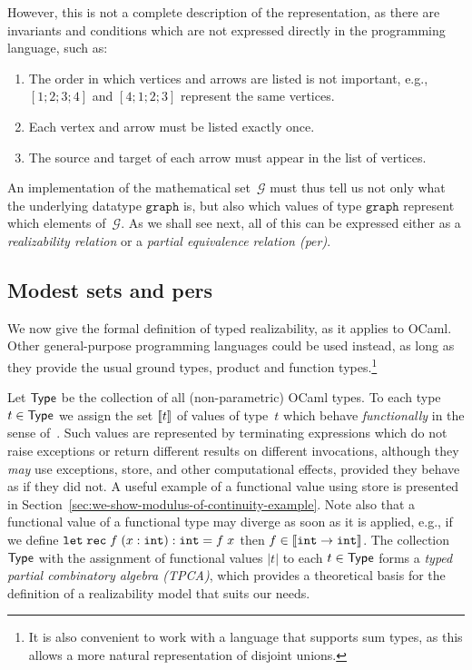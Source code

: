 %
However, this is not a complete description of the representation, as
there are invariants and conditions which are not expressed directly
in the programming language, such as:
%
\begin{enumerate}
\item The order in which vertices and arrows are listed is not
  important, e.g., $[1;2;3;4]$ and $[4;1;2;3]$ represent the same vertices.
\item Each vertex and arrow must be listed exactly once.
\item The source and target of each arrow must appear in the list of vertices.
\end{enumerate}
%
An implementation of the mathematical set~$\mathcal{G}$ must thus tell
us not only what the underlying datatype $\mathtt{graph}$ is, but also
which values of type $\mathtt{graph}$ represent which elements
of~$\mathcal{G}$. As we shall see next, all of this can be expressed
either as a \emph{realizability relation} or a \emph{partial
  equivalence relation (per)}.


\subsection{Modest sets and pers}
\label{sec:modest-sets-pers}

We now give the formal definition of typed realizability, as it
applies to OCaml. Other general-purpose programming languages could be
used instead, as long as they provide the usual ground types, product
and function types.\footnote{ It is also convenient to work with a
language that supports sum types, as this allows a more natural
representation of disjoint unions.}

Let $\mathsf{Type}$ be the collection of all (non-parametric) OCaml types. To
each type $t \in \mathsf{Type}$ we assign the set $[\![t]\!]$ of values of
type~$t$ which behave \emph{functionally} in the sense
of~\cite{longley99when}. Such values are represented by terminating
expressions which do not raise exceptions or return different results
on different invocations, although they \emph{may} use exceptions,
store, and other computational effects, provided they behave as if
they did not. A useful example of a functional value using store is
presented in Section~\ref{sec:we-show-modulus-of-continuity-example}.
Note also that a functional value of a functional type may diverge as
soon as it is applied, e.g., if we define
$\mathtt{let}\;\mathtt{rec}\;f\;(x:\mathtt{int}):\mathtt{int} = f\;x$ then $f \in [\![\mathtt{int} \to
  \mathtt{int}]\!]$. The collection $\mathsf{Type}$ with the assignment of functional
values $|t|$ to each $t \in \mathsf{Type}$ forms a \emph{typed partial
  combinatory algebra (TPCA)}, which provides a theoretical basis for
the definition of a realizability model that suits our needs.

